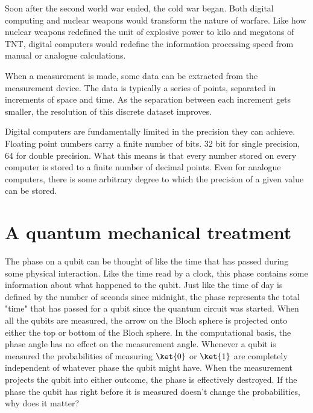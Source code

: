 \documentclass{book}
\begin{document}
Soon after the second world war ended, the cold war began. Both digital computing and nuclear weapons would transform the nature of warfare. Like how nuclear weapons redefined the unit of explosive power to kilo and megatons of TNT, digital computers would redefine the information processing speed from manual or analogue calculations. 

When a measurement is made, some data can be extracted from the measurement device. The data is typically a series of points, separated in increments of space and time. As the separation between each increment gets smaller, the resolution of this discrete dataset improves. 

Digital computers are fundamentally limited in the precision they can achieve. Floating point numbers carry a finite number of bits. 32 bit for single precision, 64 for double precision. What this means is that every number stored on every computer is stored to a finite number of decimal points. Even for analogue computers, there is some arbitrary degree to which the precision of a given value can be stored. 

\section{A quantum mechanical treatment}

The phase on a qubit can be thought of like the time that has passed during some physical interaction. Like the time read by a clock, this phase contains some information about what happened to the qubit. Just like the time of day is defined by the number of seconds since midnight, the phase represents the total "time" that has passed for a qubit since the quantum circuit was started. When all the qubits are measured, the arrow on the Bloch sphere is projected onto either the top or bottom of the Bloch sphere. In the computational basis, the phase angle has no effect on the measurement angle. Whenever a qubit is measured the probabilities of measuring $\ket{0}$ or $\ket{1}$ are completely independent of whatever phase the qubit might have. When the measurement projects the qubit into either outcome, the phase is effectively destroyed. If the phase the qubit has right before it is measured doesn't change the probabilities, why does it matter?
\end{document}
